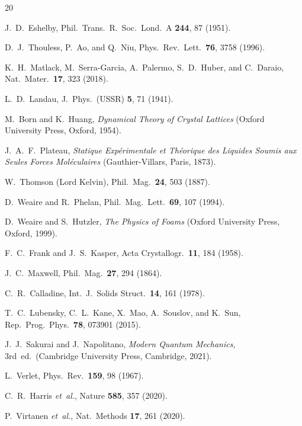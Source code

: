 \documentclass[12pt]{article}
\begin{document}
\begin{thebibliography}{20}

J.~D.~Eshelby, Phil.\ Trans.\ R.\ Soc.\ Lond.\ A \textbf{244}, 87
(1951).

D.~J.~Thouless, P.~Ao, and Q.~Niu,
Phys.\ Rev.\ Lett.\ \textbf{76}, 3758 (1996).

K.~H.~Matlack, M.~Serra-Garcia, A.~Palermo, S.~D.~Huber, and
C.~Daraio, Nat.\ Mater.\ \textbf{17}, 323 (2018).

L.~D.~Landau, J.\ Phys.\ (USSR) \textbf{5}, 71 (1941).

M.~Born and K.~Huang, \emph{Dynamical Theory of Crystal Lattices}
(Oxford University Press, Oxford, 1954).

J.~A.~F.~Plateau, \emph{Statique Exp\'erimentale et Th\'eorique des
Liquides Soumis aux Seules Forces Mol\'eculaires} (Gauthier-Villars,
Paris, 1873).

W.~Thomson (Lord Kelvin), Phil.\ Mag.\ \textbf{24}, 503 (1887).

D.~Weaire and R.~Phelan, Phil.\ Mag.\ Lett.\ \textbf{69}, 107 (1994).

D.~Weaire and S.~Hutzler, \emph{The Physics of Foams}
(Oxford University Press, Oxford, 1999).

F.~C.~Frank and J.~S.~Kasper, Acta Crystallogr.\ \textbf{11}, 184
(1958).

J.~C.~Maxwell, Phil.\ Mag.\ \textbf{27}, 294 (1864).

C.~R.~Calladine, Int.\ J.\ Solids Struct.\ \textbf{14}, 161 (1978).

T.~C.~Lubensky, C.~L.~Kane, X.~Mao, A.~Souslov, and K.~Sun,
Rep.\ Prog.\ Phys.\ \textbf{78}, 073901 (2015).

J.~J.~Sakurai and J.~Napolitano, \emph{Modern Quantum Mechanics},
3rd~ed.\ (Cambridge University Press, Cambridge, 2021).

L.~Verlet, Phys.\ Rev.\ \textbf{159}, 98 (1967).

C.~R.~Harris \emph{et~al.}, Nature \textbf{585}, 357 (2020).

P.~Virtanen \emph{et~al.}, Nat.\ Methods \textbf{17}, 261 (2020).

\end{thebibliography}
\end{document}
